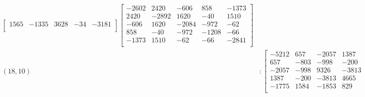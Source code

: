 \documentclass[12pt]{amsart}
\theoremstyle{plain}
\theoremstyle{definition}
\begin{document}
\begin{landscape}
\begin{align*}
\begin{bmatrix}
 1565  &   -1335  &   3628  &   -34  &   -3181  \\ 
\end{bmatrix}
\begin{bmatrix}
-2602  &   2420  &   -606  &   858  &   -1373  \\ 
 2420  &   -2892  &   1620  &   -40  &   1510  \\ 
 -606  &   1620  &   -2084  &   -972  &   -62  \\ 
 858  &   -40  &   -972  &   -1208  &   -66  \\ 
 -1373  &   1510  &   -62  &   -66  &   -2841  \\ 
\end{bmatrix}
\\
(18,10) &:
\begin{bmatrix}
-5212  &   657  &   -2057  &   1387  &   -1775  \\ 
 657  &   -803  &   -998  &   -200  &   1584  \\ 
 -2057  &   -998  &   9326  &   -3813  &   -1853  \\ 
 1387  &   -200  &   -3813  &   4665  &   829  \\ 
 -1775  &   1584  &   -1853  &   829  &   618  \\ 
\end{bmatrix}
\begin{bmatrix}
-5911  &   -1163  &   -6704  &   4325  &   -1608  \\ 
 -1163  &   449  &   -984  &   587  &   624  \\ 
 -6704  &   -984  &   6841  &   -1416  &   -2663  \\ 
 4325  &   587  &   -1416  &   2229  &   1258  \\ 
 -1608  &   624  &   -2663  &   1258  &   863  \\ 
\end{bmatrix}
\begin{bmatrix}
873  &   245  &   -2063  &   2810  &   -1082  \\ 
 245  &   -3288  &   -760  &   -2081  &   2578  \\ 
 -2063  &   -760  &   9944  &   -3787  &   -2034  \\ 
 2810  &   -2081  &   -3787  &   3427  &   1578  \\ 
 -1082  &   2578  &   -2034  &   1578  &   -20  \\ 
\end{bmatrix}
\begin{bmatrix}
-2474  &   930  &   2020  &   -1702  &   696  \\ 

\end{bmatrix}
\end{align*}
\end{landscape}
\end{document}
